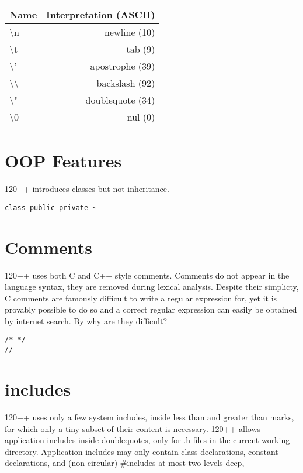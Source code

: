 \vspace{0.16in} 

\begin{tabular}{|l|r|}\hline
Name & Interpretation (ASCII) \\ \hline
{\textbackslash}n & newline (10) \\
{\textbackslash}t & tab (9) \\
{\textbackslash}' & apostrophe (39) \\
{\textbackslash}{\textbackslash} & backslash (92) \\
{\textbackslash}" & doublequote (34) \\
{\textbackslash}0 & nul (0) \\ \hline
\end{tabular}



\section{OOP Features}

120++ introduces classes but not inheritance.


\begin{verbatim}
class public private ~
\end{verbatim}

\section{Comments}

120++ uses both C and C++ style comments. Comments do not appear in
the language syntax, they are removed during lexical analysis. Despite
their simplicty, C
comments are famously difficult to write a regular expression for,
yet it is provably possible to do so and a correct regular expression
can easily be obtained by internet search. By why are they difficult?

\begin{verbatim}
/* */
//
\end{verbatim}

\section{includes}

120++ uses only a few system includes, inside less than and greater
than marks, for which only a tiny subset
of their content is necessary. 120++ allows application includes
inside doublequotes, only for .h files in the current working directory.
Application includes may only contain class declarations, constant
declarations, and (non-circular) \#includes at most two-levels deep,

